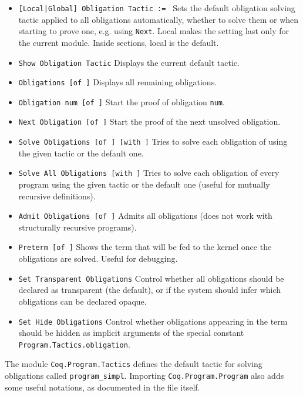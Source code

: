 \begin{itemize}
\item {\tt [Local|Global] Obligation Tactic := \tacexpr}
  Sets the default obligation
  solving tactic applied to all obligations automatically, whether to
  solve them or when starting to prove one, e.g. using {\tt Next}.
  Local makes the setting last only for the current module. Inside
  sections, local is the default.
\item {\tt Show Obligation Tactic}
  Displays the current default tactic.
\item {\tt Obligations [of \ident]} Displays all remaining
  obligations.
\item {\tt Obligation num [of \ident]} Start the proof of
  obligation {\tt num}.
\item {\tt Next Obligation [of \ident]} Start the proof of the next
  unsolved obligation.
\item {\tt Solve Obligations [of \ident] [with
    \tacexpr]}
  Tries to solve
  each obligation of \ident using the given tactic or the default one.
\item {\tt Solve All Obligations [with \tacexpr]} Tries to solve
  each obligation of every program using the given tactic or the default
  one (useful for mutually recursive definitions).
\item {\tt Admit Obligations [of \ident]} 
  Admits all obligations (does not work with structurally recursive programs).
\item {\tt Preterm [of \ident]} 
  Shows the term that will be fed to
  the kernel once the obligations are solved. Useful for debugging.
\item {\tt Set Transparent Obligations}
  Control whether all obligations should be declared as transparent (the
  default), or if the system should infer which obligations can be declared opaque. 
\item {\tt Set Hide Obligations}
  Control whether obligations appearing in the term should be hidden
  as implicit arguments of the special constant
  \texttt{Program.Tactics.obligation}.
\end{itemize}

The module {\tt Coq.Program.Tactics} defines the default tactic for solving
obligations called {\tt program\_simpl}. Importing 
{\tt Coq.Program.Program} also adds some useful notations, as documented in the file itself.

